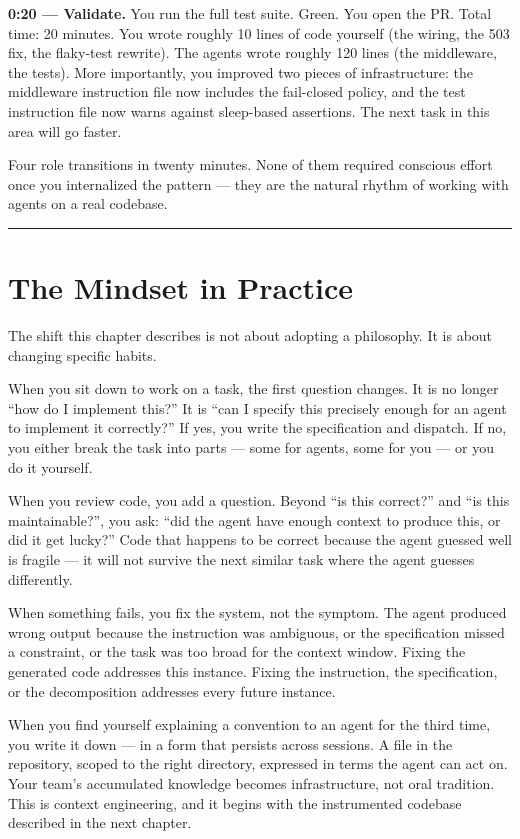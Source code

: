 \documentclass[
  a4paper,
  DIV=11,
  numbers=noendperiod]{scrreprt}
\begin{document}
\textbf{0:20 --- Validate.} You run the full test suite. Green. You open
the PR. Total time: 20 minutes. You wrote roughly 10 lines of code
yourself (the wiring, the 503 fix, the flaky-test rewrite). The agents
wrote roughly 120 lines (the middleware, the tests). More importantly,
you improved two pieces of infrastructure: the middleware instruction
file now includes the fail-closed policy, and the test instruction file
now warns against sleep-based assertions. The next task in this area
will go faster.

Four role transitions in twenty minutes. None of them required conscious
effort once you internalized the pattern --- they are the natural rhythm
of working with agents on a real codebase.

\begin{center}\rule{0.5\linewidth}{0.5pt}\end{center}

\section{The Mindset in Practice}\label{the-mindset-in-practice}

The shift this chapter describes is not about adopting a philosophy. It
is about changing specific habits.

When you sit down to work on a task, the first question changes. It is
no longer ``how do I implement this?'' It is ``can I specify this
precisely enough for an agent to implement it correctly?'' If yes, you
write the specification and dispatch. If no, you either break the task
into parts --- some for agents, some for you --- or you do it yourself.

When you review code, you add a question. Beyond ``is this correct?''
and ``is this maintainable?'', you ask: ``did the agent have enough
context to produce this, or did it get lucky?'' Code that happens to be
correct because the agent guessed well is fragile --- it will not
survive the next similar task where the agent guesses differently.

When something fails, you fix the system, not the symptom. The agent
produced wrong output because the instruction was ambiguous, or the
specification missed a constraint, or the task was too broad for the
context window. Fixing the generated code addresses this instance.
Fixing the instruction, the specification, or the decomposition
addresses every future instance.

When you find yourself explaining a convention to an agent for the third
time, you write it down --- in a form that persists across sessions. A
file in the repository, scoped to the right directory, expressed in
terms the agent can act on. Your team's accumulated knowledge becomes
infrastructure, not oral tradition. This is context engineering, and it
begins with the instrumented codebase described in the next chapter.
\end{document}
